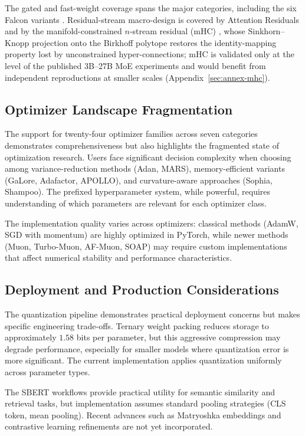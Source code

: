 The gated and fast-weight coverage spans the major categories, including the six Falcon variants \citep{zhang_falcon_2026}. Residual-stream macro-design is covered by Attention Residuals \citep{sun_attnres_2026} and by the manifold-constrained $n$-stream residual (mHC) \citep{xie_mhc_2025}, whose Sinkhorn--Knopp projection onto the Birkhoff polytope restores the identity-mapping property lost by unconstrained hyper-connections; mHC is validated only at the level of the published 3B--27B MoE experiments and would benefit from independent reproductions at smaller scales (Appendix~\ref{sec:annex-mhc}).

\subsection{Optimizer Landscape Fragmentation}

The support for twenty-four optimizer families across seven categories demonstrates comprehensiveness but also highlights the fragmented state of optimization research. Users face significant decision complexity when choosing among variance-reduction methods (Adan, MARS), memory-efficient variants (GaLore, Adafactor, APOLLO), and curvature-aware approaches (Sophia, Shampoo). The prefixed hyperparameter system, while powerful, requires understanding of which parameters are relevant for each optimizer class.

The implementation quality varies across optimizers: classical methods (AdamW, SGD with momentum) are highly optimized in PyTorch, while newer methods (Muon, Turbo-Muon, AF-Muon, SOAP) may require custom implementations that affect numerical stability and performance characteristics.

\subsection{Deployment and Production Considerations}

The quantization pipeline demonstrates practical deployment concerns but makes specific engineering trade-offs. Ternary weight packing reduces storage to approximately $1.58$ bits per parameter, but this aggressive compression may degrade performance, especially for smaller models where quantization error is more significant. The current implementation applies quantization uniformly across parameter types.

The SBERT workflows provide practical utility for semantic similarity and retrieval tasks, but implementation assumes standard pooling strategies (CLS token, mean pooling). Recent advances such as Matryoshka embeddings \citep{muennighoff_matryoshka_2021} and contrastive learning refinements \citep{chen_supervised_2020} are not yet incorporated.

